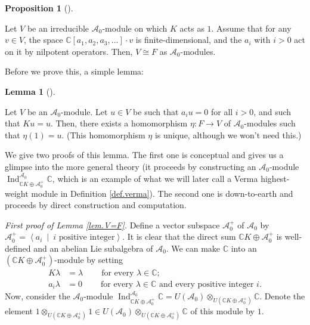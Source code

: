 \documentclass
[numbers=enddot,12pt,final,onecolumn,german,notitlepage]{scrartcl}%
\theoremstyle{definition}
\newtheorem{lem}[theo]{Lemma}
\newenvironment{lemma}[1][]
{\begin{lem}[#1]\begin{leftbar}}
{\end{leftbar}\end{lem}}
\newtheorem{prop}[theo]{Proposition}
\newenvironment{proposition}[1][]
{\begin{prop}[#1]\begin{leftbar}}
{\end{leftbar}\end{prop}}
\begin{document}
\begin{proposition}
\label{prop.V=F}Let $V$ be an irreducible $\mathcal{A}_{0}$-module on which
$K$ acts as $1$. Assume that for any $v\in V$, the space $\mathbb{C}\left[
a_{1},a_{2},a_{3},...\right]  \cdot v$ is finite-dimensional, and the $a_{i}$
with $i>0$ act on it by nilpotent operators. Then, $V\cong F$ as
$\mathcal{A}_{0}$-modules.
\end{proposition}

Before we prove this, a simple lemma:

\begin{lemma}
\label{lem.V=F}Let $V$ be an $\mathcal{A}_{0}$-module. Let $u\in V$ be such
that $a_{i}u=0$ for all $i>0$, and such that $Ku=u$. Then, there exists a
homomorphism $\eta:F\rightarrow V$ of $\mathcal{A}_{0}$-modules such that
$\eta\left(  1\right)  =u$. (This homomorphism $\eta$ is unique, although we
won't need this.)
\end{lemma}

We give two proofs of this lemma. The first one is conceptual and gives us a
glimpse into the more general theory (it proceeds by constructing an
$\mathcal{A}_{0}$-module $\operatorname*{Ind}\nolimits_{\mathbb{C}%
K\oplus\mathcal{A}_{0}^{+}}^{\mathcal{A}_{0}}\mathbb{C}$, which is an example
of what we will later call a Verma highest-weight module in Definition
\ref{def.verma}). The second one is down-to-earth and proceeds by direct
construction and computation.

\textit{First proof of Lemma \ref{lem.V=F}.} Define a vector subspace
$\mathcal{A}_{0}^{+}$ of $\mathcal{A}_{0}$ by $\mathcal{A}_{0}^{+}%
=\left\langle a_{i}\ \mid\ i\text{ positive integer}\right\rangle $. It is
clear that the direct sum $\mathbb{C}K\oplus\mathcal{A}_{0}^{+}$ is
well-defined and an abelian Lie subalgebra of $\mathcal{A}_{0}$. We can make
$\mathbb{C}$ into an $\left(  \mathbb{C}K\oplus\mathcal{A}_{0}^{+}\right)
$-module by setting%
\begin{align*}
K\lambda &  =\lambda\ \ \ \ \ \ \ \ \ \ \text{for every }\lambda\in
\mathbb{C};\\
a_{i}\lambda &  =0\ \ \ \ \ \ \ \ \ \ \text{for every }\lambda\in
\mathbb{C}\text{ and every positive integer }i.
\end{align*}
Now, consider the $\mathcal{A}_{0}$-module $\operatorname*{Ind}%
\nolimits_{\mathbb{C}K\oplus\mathcal{A}_{0}^{+}}^{\mathcal{A}_{0}}%
\mathbb{C}=U\left(  \mathcal{A}_{0}\right)  \otimes_{U\left(  \mathbb{C}%
K\oplus\mathcal{A}_{0}^{+}\right)  }\mathbb{C}$. Denote the element
$1\otimes_{U\left(  \mathbb{C}K\oplus\mathcal{A}_{0}^{+}\right)  }1\in
U\left(  \mathcal{A}_{0}\right)  \otimes_{U\left(  \mathbb{C}K\oplus
\mathcal{A}_{0}^{+}\right)  }\mathbb{C}$ of this module by $1$.
\end{document}
